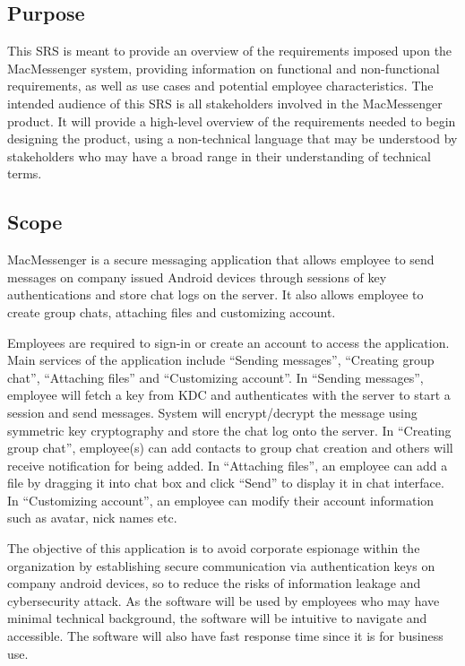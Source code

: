 \documentclass[]{article}
\begin{document}
\subsection{Purpose}
\label{sub:purpose}
\hspace{5mm}This SRS is meant to provide an overview of the requirements imposed upon the MacMessenger system, providing information on functional and non-functional requirements, as well as use cases and potential employee characteristics. The intended audience of this SRS is all stakeholders involved in the MacMessenger product. It will provide a high-level overview of the requirements needed to begin designing the product, using a non-technical language that may be understood by stakeholders who may have a broad range in their understanding of technical terms.



\subsection{Scope}
\label{sub:scope}
\hspace{5mm}MacMessenger is a secure messaging application that allows employee to send messages on company issued Android devices through sessions of key authentications and store chat logs on the server. It also allows employee to create group chats, attaching files and customizing account. 

Employees are required to sign-in or create an account to access the application. Main services of the application include “Sending messages”, “Creating group chat”, “Attaching files” and “Customizing account”. In “Sending messages”, employee will fetch a key from KDC and authenticates with the server to start a session and send messages. System will encrypt/decrypt the message using symmetric key cryptography and store the chat log onto the server. In “Creating group chat”, employee(s) can add contacts to group chat creation and others will receive notification for being added. In “Attaching files”, an employee can add a file by dragging it into chat box and click “Send” to display it in chat interface. In “Customizing account”, an employee can modify their account information such as avatar, nick names etc.

The objective of this application is to avoid corporate espionage within the organization by establishing secure communication via authentication keys on company android devices, so to reduce the risks of information leakage and cybersecurity attack. As the software will be used by employees who may have minimal technical background, the software will be intuitive to navigate and accessible. The software will also have fast response time since it is for business use. 
\end{document}
